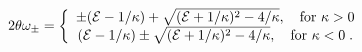 \begin{equation}
 {2\theta\omega_\pm}=\left\{
 \begin{array}{c}
  \pm({\cal E}-1/\kappa)+\sqrt{({\cal E}+
1/\kappa)^2-4/\kappa},\quad \mbox{for }
  \kappa>0\\
  ({\cal E}-1/\kappa)\pm
  \sqrt{({\cal E}+1/\kappa)^2-4/\kappa},\quad \mbox{for }
  \kappa<0 \; .
 \end{array}\right.
\end{equation}

